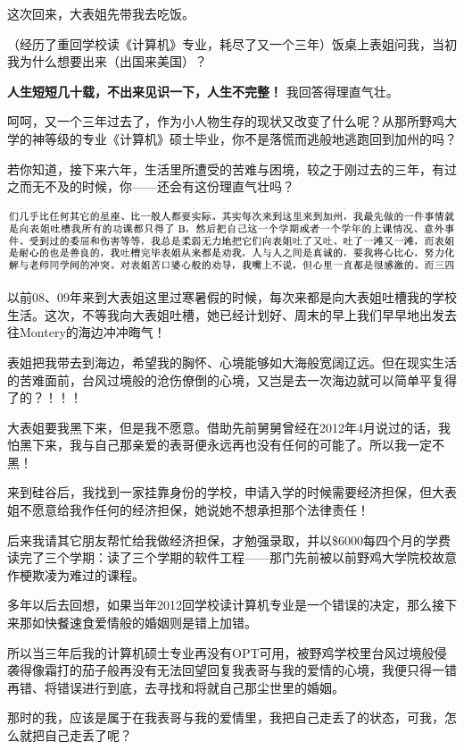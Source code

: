 \documentclass[9pt, b5paper]{article}
\begin{document}
这次回来，大表姐先带我去吃饭。

（经历了重回学校读《计算机》专业，耗尽了又一个三年）饭桌上表姐问我，当初我为什么想要出来（出国来美国）？

\textbf{人生短短几十载，不出来见识一下，人生不完整！} 我回答得理直气壮。

呵呵，又一个三年过去了，作为小人物生存的现状又改变了什么呢？从那所野鸡大学的神等级的专业《计算机》硕士毕业，你不是落慌而逃般地逃跑回到加州的吗？

若你知道，接下来六年，生活里所遭受的苦难与困境，较之于刚过去的三年，有过之而无不及的时候，你——还会有这份理直气壮吗？

\begin{center}
\includegraphics[width=.9\linewidth]{./pic/backups_plans_20210426_094357.png}
\end{center}

以前08、09年来到大表姐这里过寒暑假的时候，每次来都是向大表姐吐槽我的学校生活。这次，不等我向大表姐吐槽，她已经计划好、周末的早上我们早早地出发去往Montery的海边冲冲晦气！

表姐把我带去到海边，希望我的胸怀、心境能够如大海般宽阔辽远。但在现实生活的苦难面前，台风过境般的沧伤僚倒的心境，又岂是去一次海边就可以简单平复得了的？！！！

大表姐要我黑下来，但是我不愿意。借助先前舅舅曾经在2012年4月说过的话，我怕黑下来，我与自己那亲爱的表哥便永远再也没有任何的可能了。所以我一定不黑！

来到硅谷后，我找到一家挂靠身份的学校，申请入学的时候需要经济担保，但大表姐不愿意给我作任何的经济担保，她说她不想承担那个法律责任！

后来我请其它朋友帮忙给我做经济担保，才勉强录取，并以\$6000每四个月的学费读完了三个学期：读了三个学期的软件工程——那门先前被以前野鸡大学院校故意作梗欺凌为难过的课程。

多年以后去回想，如果当年2012回学校读计算机专业是一个错误的决定，那么接下来那如快餐速食爱情般的婚姻则是错上加错。

所以当三年后我的计算机硕士专业再没有OPT可用，被野鸡学校里台风过境般侵袭得像霜打的茄子般再没有无法回望回复我表哥与我的爱情的心境，我便只得一错再错、将错误进行到底，去寻找和将就自己那尘世里的婚姻。

那时的我，应该是属于在我表哥与我的爱情里，我把自己走丢了的状态，可我，怎么就把自己走丢了呢？
\end{document}
